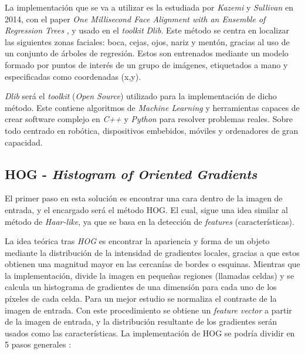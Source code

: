 La implementación que se va a utilizar es la estudiada por \textit{Kazemi} y \textit{Sullivan} en 2014, con el paper \textit{One Millisecond Face Alignment with an Ensemble of Regression Trees} \cite{inproceedings}, y usado en el \textit{toolkit} \textit{Dlib}. Este método se centra en localizar las siguientes zonas faciales: boca, cejas, ojos, nariz y mentón, gracias al uso de un conjunto de árboles de regresión. Estos son entrenados mediante  un modelo formado por puntos de interés de un grupo de imágenes, etiquetados a mano y especificadas como coordenadas (x,y). 

\textit{Dlib} será el \textit{toolkit} (\textit{Open Source}) utilizado para la implementación de dicho método. Este contiene algoritmos de \textit{Machine Learning} y herramientas capaces de crear software complejo en \textit{C++} y \textit{Python} para resolver problemas reales. Sobre todo centrado en robótica, dispositivos embebidos, móviles y ordenadores de gran capacidad. \cite{dlib}

\subsection*{HOG - \textit{Histogram of Oriented Gradients}}

El primer paso en esta solución es encontrar una cara dentro de la imagen de entrada, y el encargado será el método HOG. El cual, sigue una idea similar al método de \textit{Haar-like}, ya que se basa en la detección de \textit{features} (características).

La idea teórica tras \textit{HOG} es encontrar la apariencia y forma de un objeto mediante la distribución de la intensidad de gradientes locales, gracias a que estos obtienen una magnitud mayor en las cercanías de bordes o esquinas. Mientras que la implementación, divide la imagen en pequeñas regiones (llamadas celdas) y se calcula un histograma de gradientes de una dimensión para cada uno de los píxeles de cada celda. Para un mejor estudio se normaliza el contraste de la imagen de entrada. \cite{hog} Con este procedimiento se obtiene un \textit{feature vector} a partir de la imagen de entrada, y la distribución resultante de los gradientes serán usados como las características. La implementación de HOG se podría dividir en 5 pasos generales \cite{hog2}:

